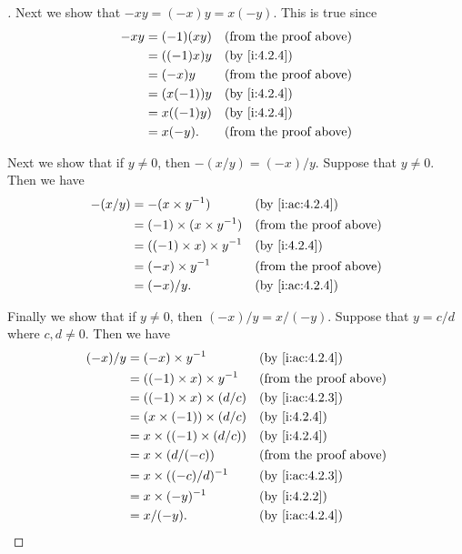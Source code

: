 \begin{proof}[]
  Next we show that \(-xy = (-x) y = x (-y)\).
  This is true since
  \begin{align*}
    -xy & = (-1) (xy)  &  & \text{(from the proof above)} \\
        & = ((-1) x) y &  & \by{i:4.2.4}                  \\
        & = (-x) y     &  & \text{(from the proof above)} \\
        & = (x (-1)) y &  & \by{i:4.2.4}                  \\
        & = x ((-1) y) &  & \by{i:4.2.4}                  \\
        & = x (-y).    &  & \text{(from the proof above)}
  \end{align*}

  Next we show that if \(y \neq 0\), then \(-(x / y) = (-x) / y\).
  Suppose that \(y \neq 0\).
  Then we have
  \begin{align*}
    -(x / y) & = -(x \times y^{-1})            &  & \by{i:ac:4.2.4}               \\
             & = (-1) \times (x \times y^{-1}) &  & \text{(from the proof above)} \\
             & = ((-1) \times x) \times y^{-1} &  & \by{i:4.2.4}                  \\
             & = (-x) \times y^{-1}            &  & \text{(from the proof above)} \\
             & = (-x) / y.                     &  & \by{i:ac:4.2.4}
  \end{align*}

  Finally we show that if \(y \neq 0\), then \((-x) / y = x / (-y)\).
  Suppose that \(y = c / d\) where \(c, d \neq 0\).
  Then we have
  \begin{align*}
    (-x) / y & = (-x) \times y^{-1}             &  & \by{i:ac:4.2.4}               \\
             & = ((-1) \times x) \times y^{-1}  &  & \text{(from the proof above)} \\
             & = ((-1) \times x) \times (d / c) &  & \by{i:ac:4.2.3}               \\
             & = (x \times (-1)) \times (d / c) &  & \by{i:4.2.4}                  \\
             & = x \times ((-1) \times (d / c)) &  & \by{i:4.2.4}                  \\
             & = x \times (d / (-c))            &  & \text{(from the proof above)} \\
             & = x \times ((-c) / d)^{-1}       &  & \by{i:ac:4.2.3}               \\
             & = x \times (-y)^{-1}             &  & \by{i:4.2.2}                  \\
             & = x / (-y).                      &  & \by{i:ac:4.2.4}
  \end{align*}
\end{proof}

